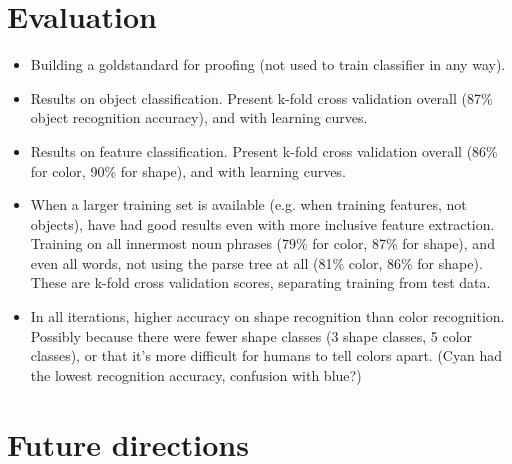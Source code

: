 \documentclass{article}
\begin{document}
\section{Evaluation}
\begin{itemize}
\item Building a goldstandard for proofing (not used to train classifier in any way).

\item Results on object classification. Present k-fold cross validation overall (87\%
object recognition accuracy), and with learning curves.

\item Results on feature classification. Present k-fold cross validation overall (86\%
for color, 90\% for shape), and with learning curves.

\item When a larger training set is available (e.g. when training features, not
objects), have had good results even with more inclusive feature extraction.
Training on all innermost noun phrases (79\% for color, 87\% for shape), and even all words, not using the parse tree at
all (81\% color, 86\% for shape). These are k-fold cross validation scores, separating training from test data.

\item In all iterations, higher accuracy on shape recognition than color
recognition. Possibly because there were fewer shape classes (3 shape classes,
5 color classes), or that it's more difficult for humans to tell colors apart.
(Cyan had the lowest recognition accuracy, confusion with blue?)
\end{itemize} 

\section{Future directions}
\end{document}
